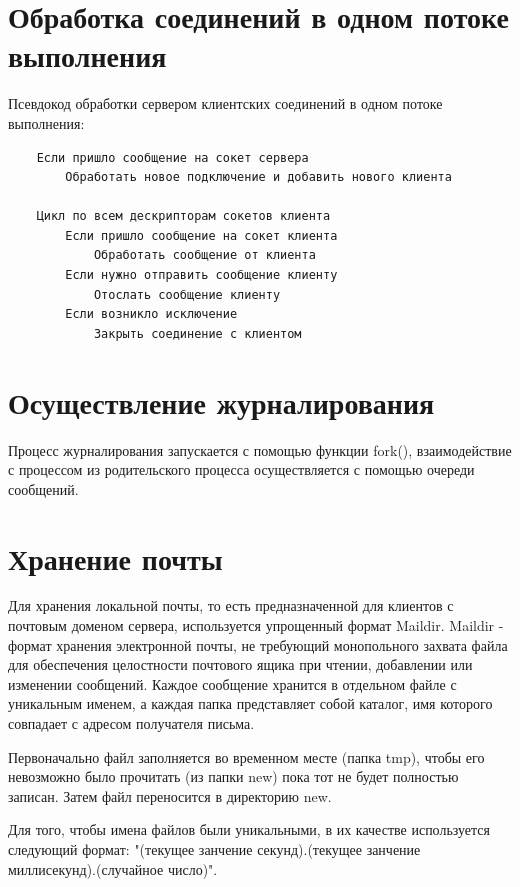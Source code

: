 \documentclass[a4paper,12pt]{report}
\begin{document}
\newpage


\section{Обработка соединений в одном потоке выполнения}

Псевдокод обработки сервером клиентских соединений в одном потоке выполнения:

\begin{verbatim}
    Если пришло сообщение на сокет сервера 
        Обработать новое подключение и добавить нового клиента
    
    Цикл по всем дескрипторам сокетов клиента
        Если пришло сообщение на сокет клиента
            Обработать сообщение от клиента
        Если нужно отправить сообщение клиенту
            Отослать сообщение клиенту
        Если возникло исключение
            Закрыть соединение с клиентом

\end{verbatim}

\section{Осуществление журналирования}

Процесс журналирования запускается с помощью функции fork(), взаимодействие с процессом из родительского процесса осуществляется с помощью очереди сообщений.

\section{Хранение почты}

Для хранения локальной почты, то есть предназначенной для клиентов с почтовым доменом сервера, используется упрощенный формат Maildir. Maildir - формат хранения электронной почты, не требующий монопольного захвата файла для обеспечения целостности почтового ящика при чтении, добавлении или изменении сообщений. Каждое сообщение хранится в отдельном файле с уникальным именем, а каждая папка представляет собой каталог, имя которого совпадает с адресом получателя письма. 

Первоначально файл заполняется во временном месте (папка tmp), чтобы его невозможно было прочитать (из папки new) пока тот не будет полностью записан. Затем файл переносится в директорию new. 

Для того, чтобы имена файлов были уникальными, в их качестве используется следующий формат: "(текущее занчение секунд).(текущее занчение миллисекунд).(случайное число)".
\end{document}
